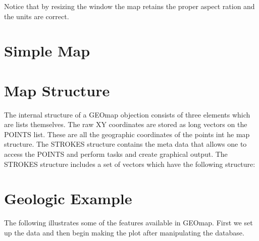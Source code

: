 \documentclass{article}
\begin{document}
Notice that by resizing the window the map retains the proper
aspect ration and the units are correct.

\section{Simple Map}

\section{Map Structure}

The internal structure of a GEOmap objection consists of
three elements which are lists themselves.
The raw XY coordinates are stored as long vectors
on the POINTS list.  These are all the geographic coordinates of the 
points int he map structure.  
The STROKES structure contains the meta data that allows one to 
access the POINTS and perform tasks and create graphical output.
The STROKES structure includes a set of vectors which have the following structure:

\section{Geologic Example}

The following illustrates some of the features available in GEOmap.
First we set up the data and then begin making the plot after manipulating the 
database.
\end{document}
